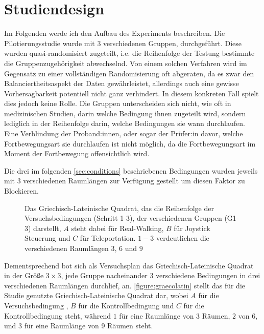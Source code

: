     \section{Studiendesign}\label{sec:setup}
    Im Folgenden werde ich den Aufbau des Experiments beschreiben.
    Die Pilotierungsstudie wurde mit 3 verschiedenen Gruppen, durchgeführt.
    Diese wurden quasi-randomisiert zugeteilt, i.e. die Reihenfolge der Testung bestimmte die Gruppenzugehörigkeit abwechselnd. Von einem solchen Verfahren wird im Gegensatz zu einer vollständigen Randomisierung oft abgeraten, da es zwar den Balanciertheitsaspekt der Daten gewährleistet, allerdings auch eine gewisse Vorhersagbarkeit potentiell nicht ganz verhindert. In diesem konkreten Fall spielt dies jedoch keine Rolle. Die Gruppen unterscheiden sich nicht, wie oft in medizinischen Studien, darin welche Bedingung ihnen zugeteilt wird, sondern lediglich in der Reihenfolge darin, welche Bedingungen sie wann durchlaufen. Eine Verblindung der Proband:innen, oder sogar der Prüfer:in davor, welche Fortbewegungsart sie durchlaufen ist nicht möglich, da die Fortbewegungsart im Moment der Fortbewegung offensichtlich wird.

    Die drei im folgenden \autoref{sec:conditions} beschriebenen Bedingungen wurden jeweils mit 3 verschiedenen Raumlängen zur Verfügung gestellt um diesen Faktor zu Blockieren. %

    \begin{figure}
        \centering
        

        \caption{Das Griechisch-Lateinische Quadrat, das die Reihenfolge der Versuchsbedingungen (Schritt 1-3), der verschiedenen Gruppen (G1-3) darstellt, $A$ steht dabei für Real-Walking, $B$ für Joystick Steuerung und $C$ für Teleportation. $1-3$ verdeutlichen die verschiedenen Raumlängen $3$, $6$ und $9$}\label{figure:graecolatin}
    \end{figure}

    Dementsprechend bot sich als Versuchsplan das Griechisch-Lateinische Quadrat in der Größe $3 \times 3$, jede Gruppe nacheinander 3 verschiedene Bedingungen in drei verschiedenen Raumlängen durchlief, an. \autoref{figure:graecolatin} stellt das für die Studie genutzte Griechisch-Lateinische Quadrat dar, wobei $A$ für die Versuchsbedingung , $B$ für die Kontrollbedingung  und $C$ für die Kontrollbedingung  steht, während $1$ für eine Raumlänge von 3 Räumen, $2$ von 6, und $3$ für eine Raumlänge von 9 Räumen steht.

